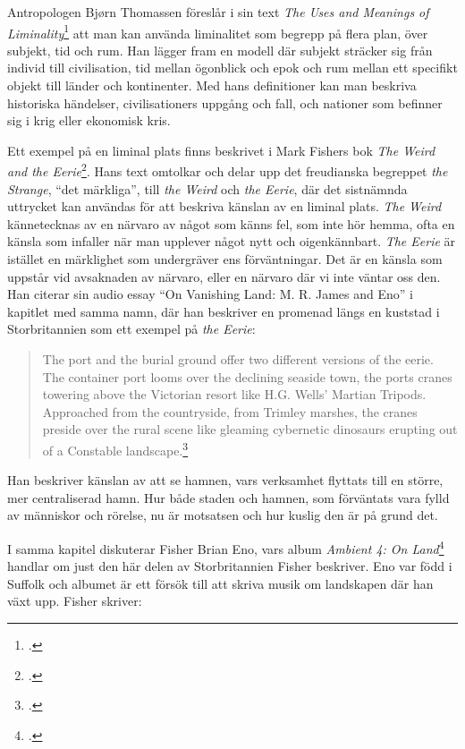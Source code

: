 \documentclass{article}
\begin{document}
Antropologen Bjørn Thomassen föreslår i sin text \emph{The Uses and Meanings of
Liminality}\footcite[12-13]{Thomassen} att man kan använda liminalitet som begrepp på flera plan, över
subjekt, tid och rum. Han lägger fram en modell där subjekt sträcker sig från individ till civilisation, tid
mellan ögonblick och epok och rum mellan ett specifikt objekt till länder och kontinenter. Med hans
definitioner kan man beskriva historiska händelser, civilisationers uppgång och fall, och nationer som
befinner sig i krig eller ekonomisk kris.

Ett exempel på en liminal plats finns beskrivet i Mark Fishers bok \emph{The Weird and the
Eerie}\footcite{Fisher}. Hans text omtolkar och delar upp det freudianska begreppet \emph{the Strange},
``det märkliga'', till \emph{the Weird} och \emph{the Eerie}, där det sistnämnda uttrycket kan användas för
att beskriva känslan av en liminal plats. \emph{The Weird} kännetecknas av en närvaro av något som känns fel,
som inte hör hemma, ofta en känsla som infaller när man upplever något nytt och oigenkännbart. \emph{The
Eerie} är istället en märklighet som undergräver ens förväntningar. Det är en känsla som uppstår vid
avsaknaden av närvaro, eller en närvaro där vi inte väntar oss den. Han citerar sin audio essay ``On Vanishing
Land: M. R. James and Eno'' i kapitlet med samma namn, där han beskriver en promenad längs en kuststad i
Storbritannien som ett exempel på \emph{the Eerie}:

\begin{quote}
The port and the burial ground offer two different versions of the eerie. The container port looms over the
declining seaside town, the ports cranes towering above the Victorian resort like H.G. Wells' Martian Tripods.
Approached from the countryside, from Trimley marshes, the cranes preside over the rural scene like gleaming
	cybernetic dinosaurs erupting out of a Constable landscape.\footcite[76]{Fisher}
\end{quote}

Han beskriver känslan av att se hamnen, vars verksamhet flyttats till en större, mer centraliserad hamn. 
Hur både staden och hamnen, som förväntats vara fylld av människor och rörelse, nu är motsatsen och hur kuslig
den är på grund det.

I samma kapitel diskuterar Fisher Brian Eno, vars album \emph{Ambient 4: On Land}\footcite{EnoLand} handlar om
just den här delen av Storbritannien Fisher beskriver. Eno var född i Suffolk och albumet är ett försök till att skriva
musik om landskapen där han växt upp. Fisher skriver: 
\end{document}
